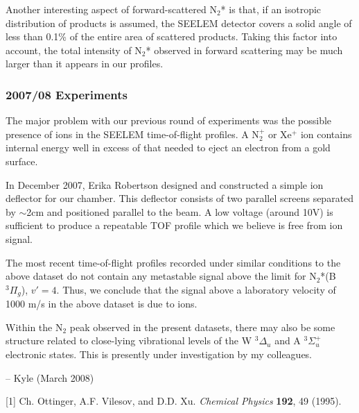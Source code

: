 \documentclass[12pt]{mitthesis}
\begin{document}
Another interesting aspect of forward-scattered N$_2$* is that, if an
isotropic distribution of products is assumed, the SEELEM detector
covers a solid angle of less than 0.1\% of the entire area of
scattered products.  Taking this factor into account, the total
intensity of N$_2$* observed in forward scattering may be much
larger than it appears in our profiles.

\subsubsection{2007/08 Experiments}

The major problem with our previous round of experiments was the
possible presence of ions in the SEELEM time-of-flight profiles.  A
N$_2^+$ or Xe$^+$ ion contains internal energy well in excess of that
needed to eject an electron from a gold surface.

In December 2007, Erika Robertson designed and constructed a simple
ion deflector for our chamber.  This deflector consists of two
parallel screens separated by $\sim$2cm and positioned parallel to the
beam.  A low voltage (around 10V) is sufficient to produce a repeatable
TOF profile which we believe is free from ion signal.

The most recent time-of-flight profiles recorded under similar
conditions to the above dataset do not contain any metastable signal
above the limit for N$_2$*(B $^3\Pi_g$), $v'=4$.  Thus, we conclude
that the signal above a laboratory velocity of 1000 m/s in the above
dataset is due to ions.  

Within the N$_2$ peak observed in the present datasets, there may also
be some structure related to close-lying vibrational levels of the W
$^3\Delta_u$ and A $^3\Sigma_u^+$ electronic states.  This is
presently under investigation by my colleagues.

-- Kyle (March 2008)

\vspace{2cm}

[1] Ch. Ottinger, A.F. Vilesov, and D.D. Xu. \emph{Chemical Physics}
\textbf{192}, 49 (1995).
\end{document}
